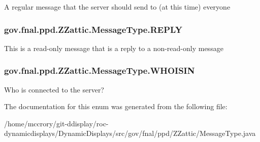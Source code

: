 A regular message that the server should send to (at this time) everyone \hypertarget{enumgov_1_1fnal_1_1ppd_1_1ZZattic_1_1MessageType_abdccf8a588a0067210be6d65a361ca5e}{
\subsubsection[{R\-E\-P\-L\-Y}]{\setlength{\rightskip}{0pt plus 5cm}gov.\-fnal.\-ppd.\-Z\-Zattic.\-Message\-Type.\-R\-E\-P\-L\-Y}}\label{enumgov_1_1fnal_1_1ppd_1_1ZZattic_1_1MessageType_abdccf8a588a0067210be6d65a361ca5e}
This is a read-\/only message that is a reply to a non-\/read-\/only message \hypertarget{enumgov_1_1fnal_1_1ppd_1_1ZZattic_1_1MessageType_ac55125e923f4785bf34e29bd34d63052}{
\subsubsection[{W\-H\-O\-I\-S\-I\-N}]{\setlength{\rightskip}{0pt plus 5cm}gov.\-fnal.\-ppd.\-Z\-Zattic.\-Message\-Type.\-W\-H\-O\-I\-S\-I\-N}}\label{enumgov_1_1fnal_1_1ppd_1_1ZZattic_1_1MessageType_ac55125e923f4785bf34e29bd34d63052}
Who is connected to the server? 

The documentation for this enum was generated from the following file\-:\begin{DoxyCompactItemize}
\item 
/home/mccrory/git-\/ddisplay/roc-\/dynamicdisplays/\-Dynamic\-Displays/src/gov/fnal/ppd/\-Z\-Zattic/Message\-Type.\-java\end{DoxyCompactItemize}

